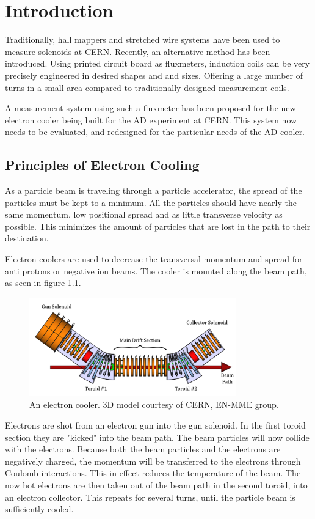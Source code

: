 \chapter{Introduction}
Traditionally, hall mappers and stretched wire systems have been
used to measure solenoids at CERN. Recently, an alternative method
has been introduced. Using printed circuit board as fluxmeters,
induction coils can be very precisely engineered in desired shapes
and and sizes. Offering a large number of turns in a small area
compared to traditionally designed measurement coils.
\cite{petrone_induction-coil_2022}

A measurement system using such a fluxmeter has been proposed for
the new electron cooler being built for the AD experiment at CERN.
This system now needs to be evaluated, and redesigned for the
particular needs of the AD cooler.


\section{Principles of Electron Cooling}
As a particle beam is traveling through a particle accelerator, the spread
of the particles must be kept to a minimum. All the particles should have
nearly the same momentum, low positional spread and as little transverse
velocity as possible. This minimizes the amount of particles that are lost
in the path to their destination.

Electron coolers are used to decrease the transversal momentum and
spread for anti protons
or negative ion beams. The cooler is mounted along the beam path, as seen in
figure \ref{fig:ecooler}.

\begin{figure}[!h]
    \centering
    \includegraphics[width=0.8\textwidth]{figs/ecooler}
    \caption{An electron cooler. 3D model courtesy of CERN, EN-MME group.}
    \label{fig:ecooler}
\end{figure}

Electrons are shot from an electron gun into the gun solenoid. In the
first toroid section they are "kicked" into the beam path. The beam particles
will now collide with the electrons. Because both the beam particles and
the electrons are negatively charged, the momentum will be
transferred to the electrons through Coulomb interactions. This in effect
reduces the temperature of the beam. The now hot electrons are
then taken out of the beam path in the second toroid, into an electron collector.
This repeats for several turns, until the particle beam is sufficiently cooled.

